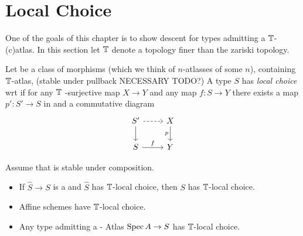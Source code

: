 
\section{Local Choice}
One of the goals of this chapter is to show descent for types admitting a $\mathbb{T}$-(c)atlas.
In this section let $\mathbb{T}$ denote a topology finer than the zariski topology.
\begin{definition}
	Let \Cov be a class of morphisms (which we think of $n$-atlasses of some $n$), containing $\mathbb{T}$-atlas, (stable under pullback NECESSARY TODO?)
	A type $S$ has \emph{local choice} wrt \Cov if for any $\mathbb{T}$ -surjective map $X \to Y$ and any map $f : S \to Y$ there exists a map  $p' : S' \to S$ in \Cov and a commutative diagram
	\[\begin{tikzcd}
		{S'} & X \\
		S & Y
		\arrow[dashed, from=1-1, to=1-2]
		\arrow[from=1-1, to=2-1]
		\arrow["p"', from=1-2, to=2-2]
		\arrow["f",from=2-1, to=2-2]
	\end{tikzcd}\]
\end{definition}
\begin{prop}{\label{prop:LocalChoice}}
	Assume that \Cov is stable under composition. %
	\begin{itemize}
		\item If $\hat S \to S$ is a \Cover and $\hat S$ has $\mathbb{T}$-local choice, then $S$ has $\mathbb{T}$-local choice. 
		\item Affine schemes have $\mathbb{T}$-local choice.
		\item Any type admitting a \Cov - Atlas $\operatorname{Spec} A \to S$ has $\mathbb{T}$-local choice.
	\end{itemize}
\end{prop}
